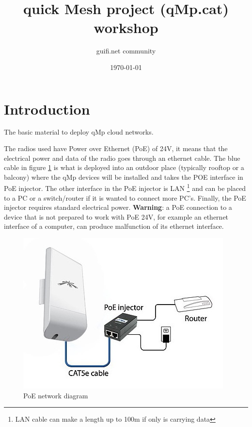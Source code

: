 \documentclass[11pt]{article}
\author{guifi.net community}
\date{\today}
\title{quick Mesh project (qMp.cat) workshop}
\begin{document}
\maketitle
\tableofcontents


\section{Introduction}
\label{sec-1}
The basic material to deploy qMp cloud networks.

The radios used have Power over Ethernet (PoE) of 24V, it means that
the electrical power and data of the radio goes through an ethernet
cable. The blue cable in figure \ref{fig:poe} is what is deployed into an
outdoor place (typically rooftop or a balcony) where the qMp devices
will be installed and takes the POE interface in PoE injector. The
other interface in the PoE injector is LAN \footnote{LAN cable can make a length up to 100m if only is carrying data} and can be placed
to a PC or a switch/router if it is wanted to connect more
PC's. Finally, the PoE injector requires standard electrical
power. \textbf{Warning}: a PoE connection to a device that is not prepared to
work with PoE 24V, for example an ethernet interface of a computer,
can produce malfunction of its ethernet interface.

\begin{figure}[htb]
\centering
\includegraphics[width=.9\linewidth]{./img/general/poe.jpg}
\caption{\label{fig:poe}PoE network diagram}
\end{figure}
\end{document}
